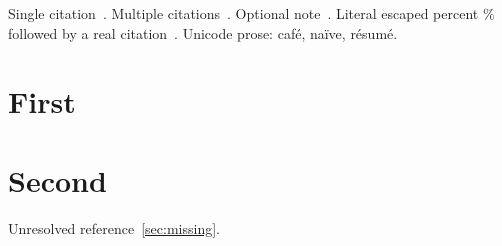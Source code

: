 \documentclass{article}
\begin{document}
Single citation~\cite{alpha}.
Multiple citations~\cite{alpha,beta}.
Optional note~\cite[pp.~1--2]{beta,missing}.
Literal escaped percent \% followed by a real citation~\cite{alpha}.
Unicode prose: caf\'{e}, na\"{i}ve, résumé.
\section{First}\label{sec:duplicate}
\section{Second}\label{sec:duplicate}
Unresolved reference~\ref{sec:missing}.


\end{document}
